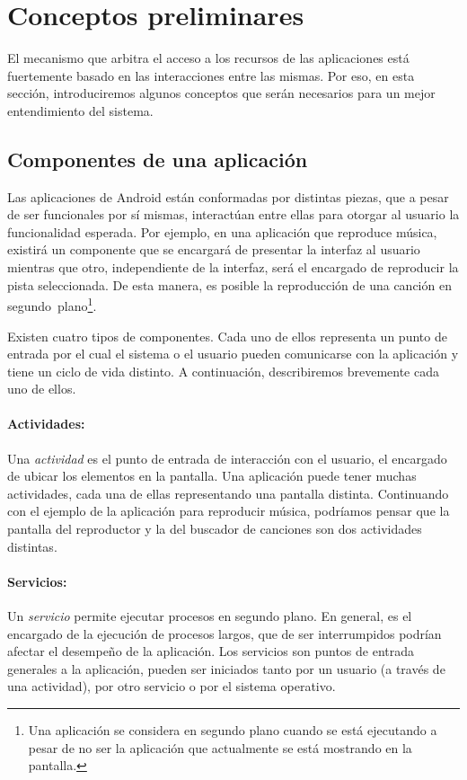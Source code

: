 \section{Conceptos preliminares}
\label{section:preliminary}
El mecanismo que arbitra el acceso a los recursos de las aplicaciones está fuertemente basado en las
interacciones entre las mismas. Por eso, en esta sección, introduciremos algunos conceptos que serán
necesarios para un mejor entendimiento del sistema.

\subsection{Componentes de una aplicación}
\label{section:preliminary:components}
Las aplicaciones de Android están conformadas por distintas piezas, que a pesar de ser funcionales
por sí mismas, interactúan entre ellas para otorgar al usuario la funcionalidad esperada. Por
ejemplo, en una aplicación que reproduce música, existirá un componente que se encargará de
presentar la interfaz al usuario mientras que otro, independiente de la interfaz, será el encargado
de reproducir la pista seleccionada. De esta manera, es posible la reproducción de una canción en
segundo~plano\footnote{Una aplicación se considera en segundo plano cuando se está ejecutando a
    pesar de no ser la aplicación que actualmente se está mostrando en la pantalla.}.

Existen cuatro tipos de componentes. Cada uno de ellos representa un punto de entrada por el cual el
sistema o el usuario pueden comunicarse con la aplicación y tiene un ciclo de vida distinto. A
continuación, describiremos brevemente cada uno de ellos.

\paragraph{Actividades:}
Una \textit{actividad} es el punto de entrada de interacción con el usuario, el encargado de ubicar
los elementos en la pantalla. Una aplicación puede tener muchas actividades, cada una de ellas
representando una pantalla distinta. Continuando con el ejemplo de la aplicación para reproducir
música, podríamos pensar que la pantalla del reproductor y la del buscador de canciones son dos
actividades distintas.

\paragraph{Servicios:}
Un \textit{servicio} permite ejecutar procesos en segundo plano. En general, es el encargado de la
ejecución de procesos largos, que de ser interrumpidos podrían afectar el desempeño de la
aplicación. Los servicios son puntos de entrada generales a la aplicación, pueden ser iniciados
tanto por un usuario (a través de una actividad), por otro servicio o por el sistema operativo.

